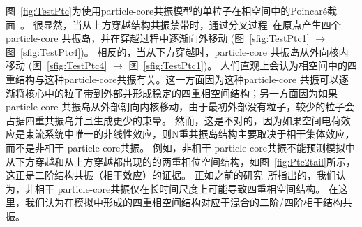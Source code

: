 图~\ref{fig:TestPtc}为使用particle-core共振模型的单粒子在相空间中的Poincar\'{e}截面~\cite{27,28}。
很显然，当从上方穿越结构共振禁带时，通过分叉过程~\cite{29,30}在原点产生四个particle-core 共振岛，并在穿越过程中逐渐向外移动
(图~\ref{sfig:TestPtc1} $\rightarrow$ 图~\ref{sfig:TestPtc4})。
相反的，当从下方穿越时，particle-core 共振岛从外向核内移动
(图~\ref{sfig:TestPtc4} $\rightarrow$ 图~\ref{sfig:TestPtc1})。
人们直观上会认为相空间中的四重结构与这种particle-core共振有关。这一方面因为这种particle-core 共振可以逐渐将核心中的粒子带到外部并形成稳定的四重相空间结构；另一方面因为如果particle-core 共振岛从外部朝向内核移动，由于最初外部没有粒子，较少的粒子会占据四重共振岛并且生成更少的束晕。
然而，这是不对的，因为如果空间电荷效应是束流系统中唯一的非线性效应，则N重共振岛结构主要取决于相干集体效应，而不是非相干 particle-core共振。
例如，非相干 particle-core共振不能预测模拟中从下方穿越和从上方穿越都出现的的两重相位空间结构，如图~\ref{fig:Ptc2tail}所示，
这正是二阶结构共振（相干效应）的证据。
正如之前的研究~\cite{17}所指出的，我们认为，非相干 particle-core共振仅在长时间尺度上可能导致四重相空间结构。
在这里，我们认为在模拟中形成的四重相空间结构对应于混合的二阶/四阶相干结构共振。

